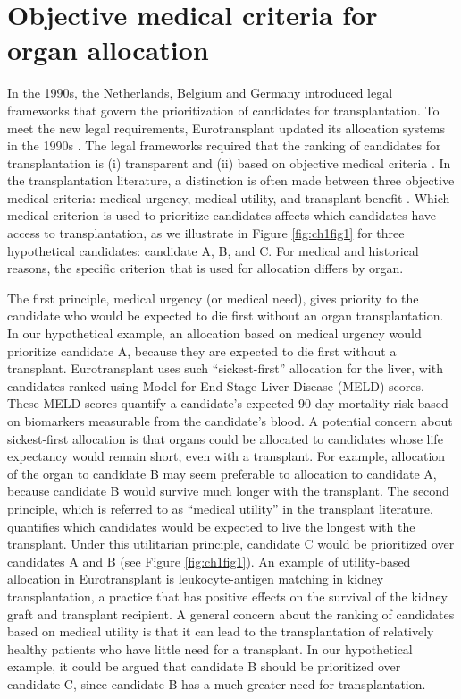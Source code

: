 \documentclass[11pt,twoside,]{book}
\begin{document}
\section{Objective medical criteria for organ allocation}\label{objective-medical-criteria-for-organ-allocation}

In the 1990s, the Netherlands, Belgium and Germany introduced legal frameworks
that govern the prioritization of candidates for transplantation. To meet the
new legal requirements, Eurotransplant updated its allocation systems in
the 1990s \citep{HaaseKromwijk1999}. The legal frameworks required that the ranking of
candidates for transplantation is (i) transparent and (ii) based on objective medical criteria
\citep{HaaseKromwijk1999, Persijn2006}. In the transplantation literature, a distinction is often
made between three objective medical criteria: medical urgency, medical utility,
and transplant benefit \citep{Schaubel2009}. Which medical criterion is used to prioritize candidates affects which
candidates have access to transplantation, as we illustrate in Figure
\ref{fig:ch1fig1} for three hypothetical candidates: candidate A, B, and C.
For medical and historical reasons, the specific criterion that is used for
allocation differs by organ.

The first principle, medical urgency (or medical need), gives priority
to the candidate who would be expected to die first without an organ transplantation. In our hypothetical example, an allocation based on medical urgency would prioritize candidate A, because they
are expected to die first without a transplant. Eurotransplant uses such
``sickest-first'' allocation for the liver, with candidates ranked using
Model for End-Stage Liver Disease (MELD) scores. These MELD scores quantify
a candidate's expected 90-day mortality risk based on biomarkers measurable from
the candidate's blood. A potential concern about sickest-first allocation is that
organs could be allocated to candidates whose life expectancy
would remain short, even with a transplant. For example, allocation of the organ to
candidate B may seem preferable to allocation to candidate A, because candidate B would survive much longer with the transplant.
\newpage
The second principle, which is referred to as ``medical utility'' in the transplant
literature, quantifies which candidates would be expected
to live the longest with the transplant. Under this utilitarian principle, candidate
C would be prioritized over candidates A and B (see Figure \ref{fig:ch1fig1}).
An example of utility-based allocation in Eurotransplant is leukocyte-antigen
matching in kidney transplantation, a practice that has positive effects on the
survival of the kidney graft and transplant recipient. A general concern about
the ranking of candidates based
on medical utility is that it can lead to the transplantation of relatively healthy
patients who have little need for a transplant. In our hypothetical example,
it could be argued that candidate B should be prioritized over candidate C,
since candidate B has a much greater need for transplantation.
\end{document}
